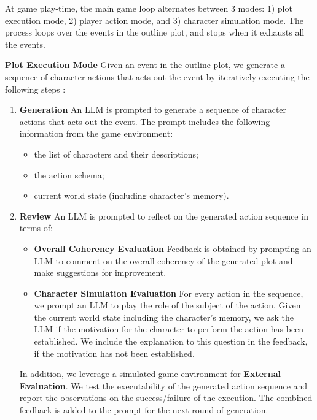 At game play-time, the main game loop alternates between 3 modes: 1) plot execution mode, 2) player action mode, and 3) character simulation mode. The process loops over the events in the outline plot, and stops when it exhausts all the events.

\noindent \textbf{Plot Execution Mode} \hspace{2mm} Given an event in the outline plot, we generate a sequence of character actions that acts out the event by iteratively executing the following steps :
\begin{enumerate}
    \item \textbf{Generation} \hspace{1mm} An LLM is prompted to generate a sequence of character actions that acts out the event. The prompt includes the following information from the game environment:
\begin{itemize}
   \item the list of characters and their descriptions;
   \item the action schema;
   \item current world state (including character's memory).
\end{itemize}
    \item \textbf{Review} \hspace{1mm} An LLM is prompted to reflect on the generated action sequence in terms of:
    \begin{itemize}
    \item \textbf{Overall Coherency Evaluation} Feedback is obtained by prompting an LLM to comment on the overall coherency of the generated plot and make suggestions for improvement.
    \item \textbf{Character Simulation Evaluation} For every action in the sequence, we prompt an LLM to play the role of the subject of the action. Given the current world state including the character’s memory, we ask the LLM if the motivation for the character to perform the action has been established. We include the explanation to this question in the feedback, if the motivation has not been established.
    \end{itemize}
    In addition, we leverage a simulated game environment for \textbf{External Evaluation}. We test the executability of the generated action sequence and report the observations on the success/failure of the execution. The combined feedback is added to the prompt for the next round of generation.

\end{enumerate}

